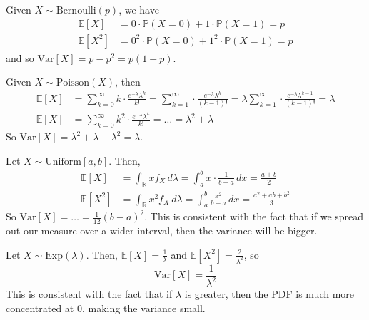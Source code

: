 \documentclass{article}
\begin{document}
    \begin{example}[Bernoulli]
      Given $X \sim \mathrm{Bernoulli}(p)$, we have
      \begin{align*}
        \mathbb{E}[X] & = 0 \cdot \mathbb{P}(X = 0) + 1 \cdot \mathbb{P}(X = 1) = p \\
        \mathbb{E}[X^2] & =  0^2 \cdot \mathbb{P}(X = 0) + 1^2 \cdot \mathbb{P}(X = 1) = p
      \end{align*}
      and so $\mathrm{Var}[X] = p - p^2 = p(1 - p)$. 
    \end{example}

    \begin{example}[Poisson]
      Given $X \sim \mathrm{Poisson}(X)$, then 
      \begin{align*}
        \mathbb{E}[X] & = \sum_{k = 0}^\infty k \cdot \frac{e^{-\lambda} \lambda^k}{k!} = \sum_{k = 1}^\infty \cdot \frac{e^{-\lambda} \lambda^k}{(k-1)!} = \lambda \sum_{k = 1}^\infty \cdot \frac{e^{-\lambda} \lambda^{k-1}}{(k-1)!} = \lambda\\
        \mathbb{E}[X] & = \sum_{k=0}^\infty k^2 \cdot \frac{e^{-\lambda} \lambda^k}{k!} = \ldots = \lambda^2 + \lambda
      \end{align*}
      So $\mathrm{Var}[X] = \lambda^2 + \lambda - \lambda^2 = \lambda$. 
    \end{example}

    \begin{example}[Uniform]
      Let $X \sim \mathrm{Uniform}[a, b]$. Then, 
      \begin{align*}
        \mathbb{E}[X] & = \int_\mathbb{R} x f_X \, d\lambda = \int_a^b x \cdot \frac{1}{b - a}\,dx = \frac{a + b}{2} \\
        \mathbb{E}[X^2] & = \int_\mathbb{R} x^2 f_X \,d\lambda = \int_a^b \frac{x^2}{b - a} \,dx = \frac{a^2 + ab + b^2}{3} 
      \end{align*}
      So $\mathrm{Var}[X] = \ldots = \frac{1}{12} (b - a)^2$. This is consistent with the fact that if we spread out our measure over a wider interval, then the variance will be bigger. 
    \end{example}

    \begin{example}[Exponential]
      Let $X \sim \mathrm{Exp}(\lambda)$. Then, $\mathbb{E}[X] = \frac{1}{\lambda}$ and $\mathbb{E}[X^2] = \frac{2}{\lambda^2}$, so 
      \begin{equation}
        \mathrm{Var}[X] = \frac{1}{\lambda^2}
      \end{equation}
      This is consistent with the fact that if $\lambda$ is greater, then the PDF is much more concentrated at $0$, making the variance small. 
    \end{example}
\end{document}
